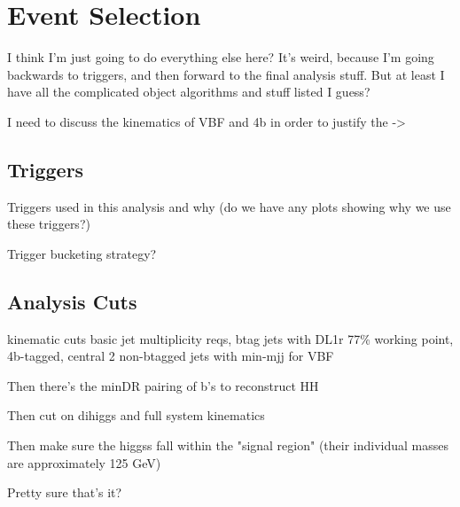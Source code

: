 \chapter{Event Selection}
    
    I think I'm just going to do everything else here? It's weird, because I'm going backwards to triggers,
        and then forward to the final analysis stuff. But at least I have all the complicated object algorithms and stuff listed I guess?

    I need to discuss the kinematics of VBF and 4b in order to justify the ->


    \section{Triggers}

        Triggers used in this analysis and why (do we have any plots showing why we use these triggers?)

        Trigger bucketing strategy?

    \section{Analysis Cuts} 

    kinematic cuts
        basic jet multiplicity reqs,
        btag jets with DL1r 77\% working point,
        4b-tagged, central
        2 non-btagged jets with min-mjj for VBF

    Then there's the minDR pairing of b's to reconstruct HH

    Then cut on dihiggs and full system kinematics

    Then make sure the higgss fall within the "signal region" (their individual masses are approximately 125 GeV)

    Pretty sure that's it?



%
